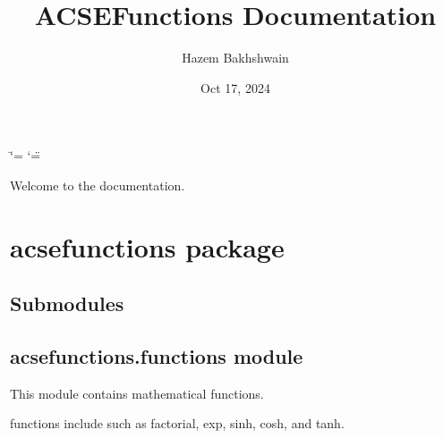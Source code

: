 \documentclass[a4paper,10pt,oneside,english]{sphinxmanual}
\title{ACSEFunctions Documentation}
\date{Oct 17, 2024}
\author{Hazem Bakhshwain}
\begin{document}
\ifdefined\shorthandoff
  \ifnum\catcode`\=\string=\active\shorthandoff{=}\fi
  \ifnum\catcode`\"=\active{}\fi
\fi

\pagestyle{empty}
\sphinxmaketitle
\pagestyle{plain}
\sphinxtableofcontents
\pagestyle{normal}
\label{\detokenize{index::doc}}


\sphinxAtStartPar
Welcome to the  documentation.

\sphinxstepscope


\chapter{acsefunctions package}
\label{\detokenize{acsefunctions:acsefunctions-package}}\label{\detokenize{acsefunctions::doc}}

\section{Submodules}
\label{\detokenize{acsefunctions:submodules}}

\section{acsefunctions.functions module}
\label{\detokenize{acsefunctions:module-acsefunctions.functions}}\label{\detokenize{acsefunctions:acsefunctions-functions-module}}
\sphinxAtStartPar
This module contains mathematical functions.

\sphinxAtStartPar
functions include such as factorial, exp, sinh, cosh, and tanh.
\end{document}
